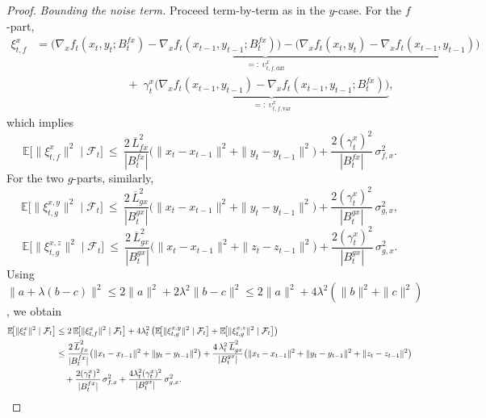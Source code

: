 \documentclass{uai2026} %
\newcommand{\EE}{\mathbb{E}}
\newcommand{\F}{\mathcal{F}}
\begin{document}
\begin{proof}
\noindent\textit{Bounding the noise term.}
Proceed term-by-term as in the $y$-case. For the $f$-part,
\begin{align}
    \xi^{x}_{t,f}
&=\underbrace{\big(\nabla_x f_t(x_t,y_t;B_t^{fx})-\nabla_x f_t(x_{t-1},y_{t-1};B_t^{fx})\big)
-\big(\nabla_x f_t(x_t,y_t)-\nabla_x f_t(x_{t-1},y_{t-1})\big)}_{=:\ \upsilon^{x}_{t,f,\mathrm{diff}}}\nonumber\\
&\qquad\qquad\qquad\qquad+\;\gamma_t^x\underbrace{\big(\nabla_x f_t(x_{t-1},y_{t-1})-\nabla_x f_t(x_{t-1},y_{t-1};B_t^{fx})\big)}_{=:\ \upsilon^{x}_{t,f,\mathrm{var}}},
\end{align}
which implies
\begin{equation}\label{eq:x-noise-f}
\EE\!\big[\|\xi^{x}_{t,f}\|^2\mid\F_t\big]
\ \le\ \frac{2\,\overline L_{fx}^2}{|B_t^{fx}|}\big(\|x_t-x_{t-1}\|^2+\|y_t-y_{t-1}\|^2\big)
+\frac{2(\gamma_t^x)^2}{|B_t^{fx}|}\,\sigma_{f,x}^2.
\end{equation}
For the two $g$-parts, similarly,
\[
\EE\!\big[\|\xi^{x,y}_{t,g}\|^2\mid\F_t\big]
\ \le\ \frac{2\,\overline L_{gx}^2}{|B_t^{gx}|}\big(\|x_t-x_{t-1}\|^2+\|y_t-y_{t-1}\|^2\big)
+\frac{2(\gamma_t^x)^2}{|B_t^{gx}|}\,\sigma_{g,x}^2,
\]
\[
\EE\!\big[\|\xi^{x,z}_{t,g}\|^2\mid\F_t\big]
\ \le\ \frac{2\,\overline L_{gx}^2}{|B_t^{gx}|}\big(\|x_t-x_{t-1}\|^2+\|z_t-z_{t-1}\|^2\big)
+\frac{2(\gamma_t^x)^2}{|B_t^{gx}|}\,\sigma_{g,x}^2.
\]
Using $\|a+\lambda(b-c)\|^2\le 2\|a\|^2+2\lambda^2\|b-c\|^2\le 2\|a\|^2+4\lambda^2(\|b\|^2+\|c\|^2)$, we obtain
\begin{align}
\EE\!\big[\|\xi_t^x\|^2\mid\F_t\big]
&\le 2\,\EE\!\big[\|\xi^{x}_{t,f}\|^2\mid\F_t\big]+4\lambda_t^2\left(\EE\!\big[\|\xi^{x,y}_{t,g}\|^2\mid\F_t\big]+\EE\!\big[\|\xi^{x,z}_{t,g}\|^2\mid\F_t\big]\right)\notag\\
&\le \frac{2\,\overline L_{fx}^2}{|B_t^{fx}|}\big(\|x_t-x_{t-1}\|^2+\|y_t-y_{t-1}\|^2\big)
+ \frac{4\,\lambda_t^2\,\overline L_{gx}^2}{|B_t^{gx}|}\big(\|x_t-x_{t-1}\|^2+\|y_t-y_{t-1}\|^2+\|z_t-z_{t-1}\|^2\big)\notag\\
&\quad + \frac{2(\gamma_t^x)^2}{|B_t^{fx}|}\,\sigma_{f,x}^2
+ \frac{4\lambda_t^2(\gamma_t^x)^2}{|B_t^{gx}|}\,\sigma_{g,x}^2.
\label{eq:x-noise}
\end{align}


\end{proof}
\end{document}
